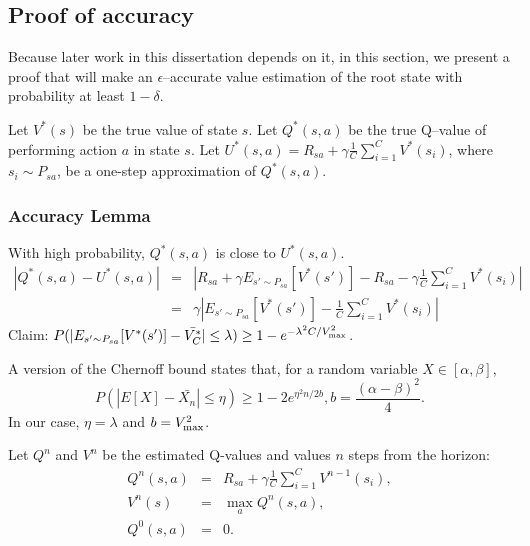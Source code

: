 \subsection{Proof of accuracy}

Because later work in this dissertation depends on it, in this section, we present a proof that  will make an $\epsilon$--accurate value estimation of the root state with probability at least $1-\delta$.


Let $V^*(s)$ be the true value of state $s$. Let $Q^*(s,a)$ be the true Q--value of performing action $a$ in state $s$. Let $U^*(s,a) = R_{sa}+\gamma\frac 1 C \sum_{i=1}^C V^*(s_i)$, where $s_i\sim P_{sa}$, be a one-step approximation of $Q^*(s,a)$.

\subsubsection{ Accuracy Lemma} With high probability, $Q^*(s,a)$ is close to $U^*(s,a)$.
\begin{eqnarray}
|Q^*(s,a)-U^*(s,a)| &=& |R_{sa}+\gamma E_{s'\sim P_{sa}}[V^*(s')] - R_{sa} - \gamma \frac 1 C \sum_{i=1}^C V^*(s_i)|\\
&=& \gamma |E_{s'\sim P_{sa}}[V^*(s')] - \frac 1 C \sum_{i=1}^C V^*(s_i)|
\end{eqnarray}
Claim: $P(|E_{s'\sim P_{sa}}[V^*(s')] - \bar{V^*_C}| \leq \lambda) \geq 1-e^{-\lambda^2 C / {V_{\rm max}^2}}$.

A version of the Chernoff bound states that, for a random variable $X\in[\alpha,\beta]$,
$$P(|E[X] - \bar{X_n}| \leq \eta) \geq 1-2e^{\eta^2 n / 2 b}, b=\frac{(\alpha-\beta)^2}4.$$
In our case, $\eta=\lambda$ and $b=V_{\rm max}^2$.


Let $Q^n$ and $V^n$ be the estimated Q-values and values $n$ steps from the horizon:
\begin{eqnarray}
Q^n(s,a)&=&R_{sa}+\gamma \frac 1 C \sum_{i=1}^C V^{n-1}(s_i),\\
V^n(s) &=& \max_a Q^n(s,a),\\
Q^0(s,a)&=&0.
\end{eqnarray}

